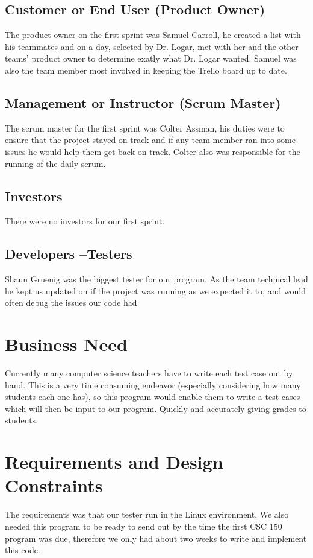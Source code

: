 \subsection{Customer or End User (Product Owner)}
The product owner on the first sprint was Samuel Carroll, he created a list with his teammates 
and on a day, selected by Dr. Logar, met with her and the other teams' product owner to determine
exatly what Dr. Logar wanted. Samuel was also the team member most involved in keeping the Trello 
board up to date.


\subsection{Management or Instructor (Scrum Master)}
The scrum master for the first sprint was Colter Assman, his duties were to ensure that the project 
stayed on track and if any team member ran into some issues he would help them get back on track.   
Colter also was responsible for the running of the daily scrum.


\subsection{Investors}
There were no investors for our first sprint.


\subsection{Developers --Testers}
Shaun Gruenig was the biggest tester for our program.   As the team technical lead 
he kept us updated on if the project was running as we expected it to, and would 
often debug the issues our code had.


\section{Business Need}
Currently many computer science teachers have to write each test case out by hand.   
This is a very time consuming endeavor (especially considering how many students each
one has), so this program would enable them to write a test cases which will then be input
to our program.   Quickly and accurately giving grades to students.

\section{Requirements and Design Constraints}
The requirements was that our tester run in the Linux environment.   We also needed this 
program to be ready to send out by the time the first CSC 150 program was due, therefore
we only had about two weeks to write and implement this code.


